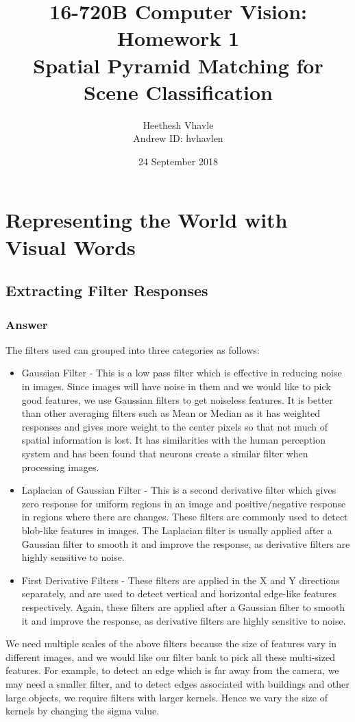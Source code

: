 \documentclass[a4paper]{article}
\title{16-720B Computer Vision: Homework 1 \\
Spatial Pyramid Matching for Scene Classification}
\author{Heethesh Vhavle\\
Andrew ID: hvhavlen}
\date{24 September 2018}
\begin{document}
\maketitle

\section{Representing the World with Visual Words}
\subsection{Extracting Filter Responses}
\subsubsection{Answer}

The filters used can grouped into three categories as follows:
\begin{itemize}
    \item Gaussian Filter - This is a low pass filter which is effective in reducing noise in images. Since images will have noise in them and we would like to pick good features, we use Gaussian filters to get noiseless features. It is better than other averaging filters such as Mean or Median as it has weighted responses and gives more weight to the center pixels so that not much of spatial information is lost. It has similarities with the human perception system and has been found that neurons create a similar filter when processing images. 
    \item Laplacian of Gaussian Filter - This is a second derivative filter which gives zero response for uniform regions in an image and positive/negative response in regions where there are changes. These filters are commonly used to detect blob-like features in images. The Laplacian filter is usually applied after a Gaussian filter to smooth it and improve the response, as derivative filters are highly sensitive to noise.
    \item First Derivative Filters - These filters are applied in the X and Y directions separately, and are used to detect vertical and horizontal edge-like features respectively. Again, these filters are applied after a Gaussian filter to smooth it and improve the response, as derivative filters are highly sensitive to noise.
\end{itemize}

We need multiple scales of the above filters because the size of features vary in different images, and we would like our filter bank to pick all these multi-sized features. For example, to detect an edge which is far away from the camera, we may need a smaller filter, and to detect edges associated with buildings and other large objects, we require filters with larger kernels. Hence we vary the size of kernels by changing the sigma value.
\end{document}
